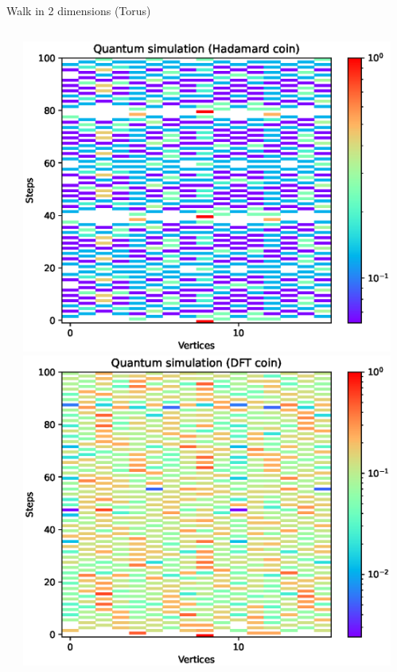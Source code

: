 \documentclass[aspectratio=169]{beamer}
\begin{document}
\begin{frame}{Walk in 2 dimensions (Torus)}
\begin{columns}[onlytextwidth]
\begin{column}{.30\textwidth}
    \end{column}
    \begin{column}{.30\textwidth}
      \includegraphics[width=\textwidth]{./figures/results/grid_horizontal_vertical/hadamard.eps}
      \vspace{-1em} %
      \includegraphics[width=\textwidth]{./figures/results/grid_horizontal_vertical/dft.eps}
    \end{column}
    \begin{column}{.20\textwidth}
    \end{column}
  \end{columns}
\end{frame}
\end{document}
